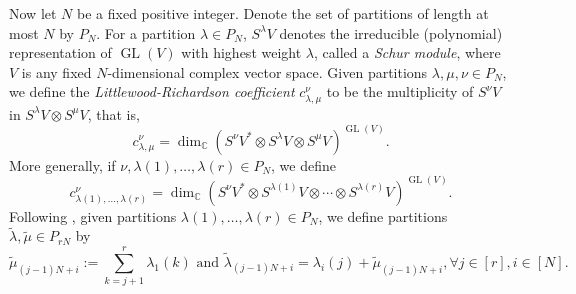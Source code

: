 \documentclass[11pt]{article}
\theoremstyle{definition}
\numberwithin{equation}{section}
\newcommand{\GL}{\operatorname{GL}}
\newcommand{\CC}{\mathbb C}
\begin{document}
Now let $N$ be a fixed positive integer. Denote the set of partitions of length at most $N$ by $P_N$. For a partition $\lambda \in P_N$,  $S^\lambda V$ denotes the irreducible (polynomial) representation of $\GL(V)$ with highest weight $\lambda$, called a \emph{Schur module}, where $V$ is any fixed $N$-dimensional complex vector space.  Given partitions $\lambda, \mu, \nu \in P_N$, we define the \emph{Littlewood-Richardson coefficient} $c^\nu_{\lambda, \mu}$ to be the multiplicity of $S^\nu V$ in $S^\lambda V \otimes S^\mu V$, that is,
\[
c^\nu_{\lambda,\mu} = \dim_\CC \left( S^\nu V^* \otimes S^\lambda V \otimes S^\mu V\right)^{\GL(V)}.
\]
More generally, if $\nu, \lambda(1), \ldots, \lambda(r) \in P_N$, we define
\[
c^\nu_{\lambda(1),\ldots, \lambda(r)} = \dim_\CC \left(S^\nu V^* \otimes S^{\lambda(1)} V \otimes \cdots \otimes S^{\lambda(r)} V\right)^{\GL(V)}.
\]
Following \cite{Zel-1999}, given partitions $\lambda(1), \ldots, \lambda(r) \in P_N$, we define partitions $\widetilde{\lambda}, \widetilde{\mu} \in P_{rN}$ by
\begin{equation}\label{Zel-trick-eqns}
\widetilde{\mu}_{(j-1)N+i}:=\sum_{k=j+1}^r \lambda_1(k) \text{~and~} \widetilde{\lambda}_{(j-1)N+i}=\lambda_i(j)+\widetilde{\mu}_{(j-1)N+i}, \forall j \in [r], i \in [N].
\end{equation}
\end{document}
